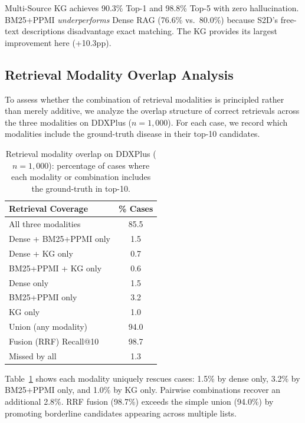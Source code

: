 \documentclass[runningheads]{llncs}
\begin{document}
Multi-Source KG achieves 90.3\% Top-1 and 98.8\% Top-5 with zero hallucination. BM25+PPMI \emph{underperforms} Dense RAG (76.6\% vs.\ 80.0\%) because S2D's free-text descriptions disadvantage exact matching. The KG provides its largest improvement here (+10.3pp).

\subsection{Retrieval Modality Overlap Analysis}
\label{sec:overlap}

To assess whether the combination of retrieval modalities is principled rather than merely additive, we analyze the overlap structure of correct retrievals across the three modalities on DDXPlus ($n{=}1{,}000$). For each case, we record which modalities include the ground-truth disease in their top-10 candidates.

\begin{table}[t]
\centering
\caption{Retrieval modality overlap on DDXPlus ($n{=}1{,}000$): percentage of cases where each modality or combination includes the ground-truth in top-10.}
\label{tab:overlap}
\begin{tabular}{lc}
\toprule
\textbf{Retrieval Coverage} & \textbf{\% Cases} \\
\midrule
All three modalities            & 85.5 \\
Dense + BM25+PPMI only          & 1.5 \\
Dense + KG only                 & 0.7 \\
BM25+PPMI + KG only             & 0.6 \\
Dense only                      & 1.5 \\
BM25+PPMI only                  & 3.2 \\
KG only                         & 1.0 \\
\midrule
Union (any modality)            & 94.0 \\
Fusion (RRF) Recall@10          & 98.7 \\
Missed by all                   & 1.3 \\
\bottomrule
\end{tabular}
\end{table}

Table~\ref{tab:overlap} shows each modality uniquely rescues cases: 1.5\% by dense only, 3.2\% by BM25+PPMI only, and 1.0\% by KG only. Pairwise combinations recover an additional 2.8\%. RRF fusion (98.7\%) exceeds the simple union (94.0\%) by promoting borderline candidates appearing across multiple lists.
\end{document}
